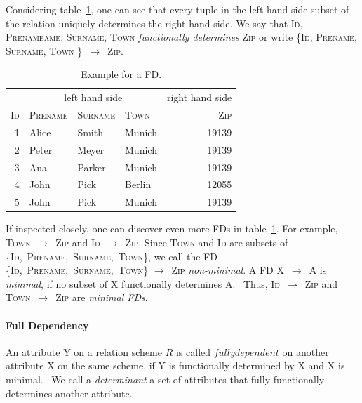 Considering table~\ref{tab:fd-example}, one can see that every tuple in the left hand side subset of the relation uniquely determines the right hand side.
We say that \textsc{Id}, \textsc{Prenameame}, \textsc{Surname}, \textsc{Town} \emph{functionally determines} \textsc{Zip} or write \{\textsc{Id}, \textsc{Prename}, \textsc{Surname}, \textsc{Town} \}~\( \rightarrow \)~\textsc{Zip}.~\cite[p.~43]{MAI83}

\begin{table}[ht]
    \centering
    \begin{tabular}{rlllr}
        \toprule
        & \multicolumn{3}{c}{left hand side} & \multicolumn{1}{c}{right hand side} \\ \cmidrule(lr{.25em}){1-4} \cmidrule(l{4.75em}){4-5}
        \textsc{Id} & \textsc{Prename} & \textsc{Surname} & \textsc{Town} & \textsc{Zip} \\
        \midrule
        1 & Alice & Smith & Munich & 19139 \\
        2 & Peter& Meyer & Munich & 19139 \\
        3 & Ana & Parker & Munich & 19139  \\
        4 & John & Pick & Berlin & 12055 \\
        5 & John & Pick & Munich & 19139 \\
        \bottomrule
    \end{tabular}
    \caption{Example for a FD.}\label{tab:fd-example}
\end{table}


If inspected closely, one can discover even more FDs in table~\ref{tab:fd-example}.
For example, \textsc{Town}~\( \rightarrow \)~\textsc{Zip} and \textsc{Id}~\( \rightarrow \)~\textsc{Zip}.
Since \textsc{Town} and \textsc{Id} are subsets of \{\textsc{Id},~\textsc{Prename},~\textsc{Surname},~\textsc{Town}\}, we call the FD \{\textsc{Id},~\textsc{Prename},~\textsc{Surname},~\textsc{Town}\} \( \rightarrow \)~\textsc{Zip} \emph{non-minimal}.
A FD X~\( \rightarrow \)~A is \emph{minimal}, if no subset of X functionally determines A.~\cite[p.~2]{PAP15}
Thus, \textsc{Id}~\( \rightarrow \)~\textsc{Zip} and \textsc{Town}~\( \rightarrow \)~\textsc{Zip} are \emph{minimal FDs}.

\paragraph{Full Dependency} An attribute \textsc{Y} on a relation scheme \( R \) is called \( fully dependent \) on another attribute \textsc{X} on the same scheme, if \textsc{Y} is functionally determined by \textsc{X} and \textsc{X} is minimal.~\cite[p.~61]{SCH17}
We call a \emph{determinant} a set of attributes that fully functionally determines another attribute.


